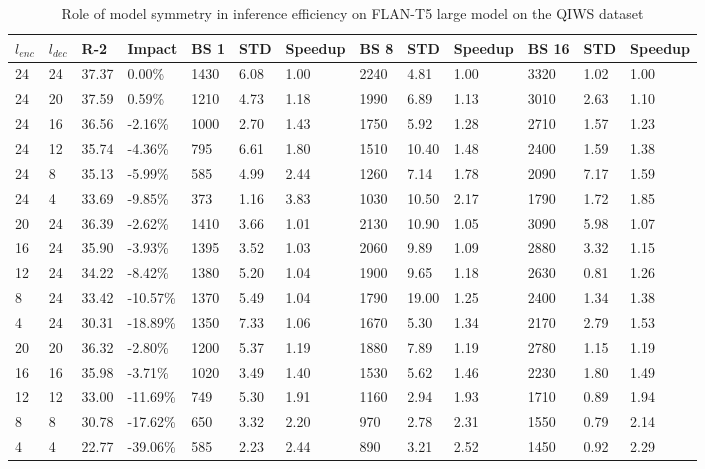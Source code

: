 \begin{table*}[!ht]
    \centering
    \caption{Role of model symmetry in inference efficiency on FLAN-T5 large model on the QIWS dataset}
    \small
    \small
    \begin{tabular}{|l|l|l|l|l|l|l|l|l|l|l|l|l|}
    \hline
         $l_{enc}$ & $l_{dec}$ & R-2 & Impact & BS 1 & STD & Speedup & BS 8 & STD  & Speedup & BS 16 & STD & Speedup \\ \hline
         24 & 24 & 37.37 & 0.00\% & 1430 & 6.08 & 1.00 & 2240 & 4.81 & 1.00 & 3320 & 1.02 & 1.00 \\ \hline
        24 & 20 & 37.59 & 0.59\% & 1210 & 4.73 & 1.18 & 1990 & 6.89 & 1.13 & 3010 & 2.63 & 1.10 \\ \hline
        24 & 16 & 36.56 & -2.16\% & 1000 & 2.70 & 1.43 & 1750 & 5.92 & 1.28 & 2710 & 1.57 & 1.23 \\ \hline
        24 & 12 & 35.74 & -4.36\% & 795 & 6.61 & 1.80 & 1510 & 10.40 & 1.48 & 2400 & 1.59 & 1.38 \\ \hline
        24 & 8 & 35.13 & -5.99\% & 585 & 4.99 & 2.44 & 1260 & 7.14 & 1.78 & 2090 & 7.17 & 1.59 \\ \hline
        24 & 4 & 33.69 & -9.85\% & 373 & 1.16 & 3.83 & 1030 & 10.50 & 2.17 & 1790 & 1.72 & 1.85 \\ \hline
        20 & 24 & 36.39 & -2.62\% & 1410 & 3.66 & 1.01 & 2130 & 10.90 & 1.05 & 3090 & 5.98 & 1.07 \\ \hline
        16 & 24 & 35.90 & -3.93\% & 1395 & 3.52 & 1.03 & 2060 & 9.89 & 1.09 & 2880 & 3.32 & 1.15 \\ \hline
        12 & 24 & 34.22 & -8.42\% & 1380 & 5.20 & 1.04 & 1900 & 9.65 & 1.18 & 2630 & 0.81 & 1.26 \\ \hline
        8 & 24 & 33.42 & -10.57\% & 1370 & 5.49 & 1.04 & 1790 & 19.00 & 1.25 & 2400 & 1.34 & 1.38 \\ \hline
        4 & 24 & 30.31 & -18.89\% & 1350 & 7.33 & 1.06 & 1670 & 5.30 & 1.34 & 2170 & 2.79 & 1.53 \\ \hline
        20 & 20 & 36.32 & -2.80\% & 1200 & 5.37 & 1.19 & 1880 & 7.89 & 1.19 & 2780 & 1.15 & 1.19 \\ \hline
        16 & 16 & 35.98 & -3.71\% & 1020 & 3.49 & 1.40 & 1530 & 5.62 & 1.46 & 2230 & 1.80 & 1.49 \\ \hline
        12 & 12 & 33.00 & -11.69\% & 749 & 5.30 & 1.91 & 1160 & 2.94 & 1.93 & 1710 & 0.89 & 1.94 \\ \hline
        8 & 8 & 30.78 & -17.62\% & 650 & 3.32 & 2.20 & 970 & 2.78 & 2.31 & 1550 & 0.79 & 2.14 \\ \hline
        4 & 4 & 22.77 & -39.06\% & 585 & 2.23 & 2.44 & 890 & 3.21 & 2.52 & 1450 & 0.92 & 2.29 \\ \hline
    \end{tabular}
    \label{tab:qiws-asym-inference-large}
\end{table*}

